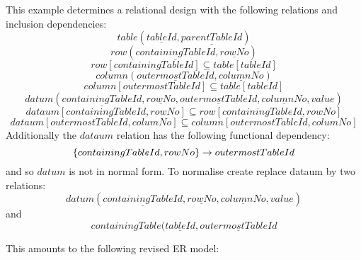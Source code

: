 This example determines a relational design with the following
relations and inclusion dependencies:
\begin{equation}
table(\underline{tableId},
\underline{parentTableId})
\end{equation}
\begin{equation}
row(
\underline{containingTableId},
\underline{rowNo}
)
\end{equation}
\begin{equation}
row[containingTableId] \subseteq table[tableId]
\end{equation}
\begin{equation}
column(\underline{outermostTableId},
\underline{columnNo})
\end{equation}
\begin{equation}
column[outermostTableId] \subseteq table[tableId]
\end{equation}
\begin{equation}
datum(\underline{containingTableId},
\underline{rowNo},
\underline{outermostTableId},
\underline{columnNo},value)
\end{equation}
\begin{equation}
dataum[containingTableId,rowNo] \subseteq row[containingTableId,rowNo]
\end{equation}
\begin{equation}
dataum[outermostTableId,columNo] \subseteq column[outermostTableId,columNo]
\end{equation}
Additionally the $dataum$ relation has the following functional dependency:
\begin{equation}
\left\{containingTableId,rowNo\right\} \rightarrow outermostTableId
\end{equation}
and so $datum$ is not in normal form. To normalise create replace dataum 
by two relations:
\begin{equation}
datum(\underline{containingTableId},
\underline{rowNo},
\underline{columnNo},value)
\end{equation}
and
\begin{equation}
containingTable(\underline{tableId},
\underline{outermostTableId}
\end{equation}

This amounts to the following revised ER model:

